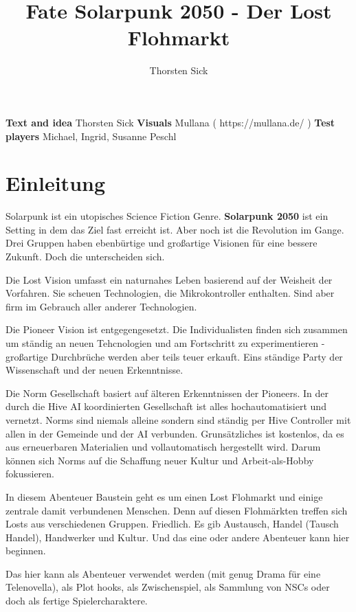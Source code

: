 \documentclass{book}
\title{Fate Solarpunk 2050 - Der Lost Flohmarkt}
\author{Thorsten Sick}
\begin{document}
%
%
\mbox{}
\thispagestyle{empty}
\BgThispage

\newpage
\begin{center}
\textbf{Text and idea}
\newline
Thorsten Sick
\newline
\textbf{Visuals}
\newline
Mullana ( https://mullana.de/ )
\newline
\textbf{Test players}
\newline
Michael, Ingrid, Susanne Peschl
\newline
\end{center}
\newpage

%

\chapter{Einleitung}

Solarpunk ist ein utopisches Science Fiction Genre. \textbf{Solarpunk 2050} ist ein Setting in dem das Ziel fast erreicht ist. Aber noch ist die Revolution im Gange. Drei Gruppen haben ebenbürtige und großartige Visionen für eine bessere Zukunft. Doch die unterscheiden sich.

Die Lost Vision umfasst ein naturnahes Leben basierend auf der Weisheit der Vorfahren. Sie scheuen Technologien, die Mikrokontroller enthalten. Sind aber firm im Gebrauch aller anderer Technologien.

Die Pioneer Vision ist entgegengesetzt. Die Individualisten finden sich zusammen um ständig an neuen Tehcnologien und am Fortschritt zu experimentieren - großartige Durchbrüche werden aber teils teuer erkauft. Eins ständige Party der Wissenschaft und der neuen Erkenntnisse.

Die Norm Gesellschaft basiert auf älteren Erkenntnissen der Pioneers. In der durch die Hive AI koordinierten Gesellschaft ist alles hochautomatisiert und vernetzt. Norms sind niemals alleine sondern sind ständig per Hive Controller mit allen in der Gemeinde und der AI verbunden. Grunsätzliches ist kostenlos, da es aus erneuerbaren Materialien und vollautomatisch hergestellt wird. Darum können sich Norms auf die Schaffung neuer Kultur und Arbeit-als-Hobby fokussieren.

In diesem Abenteuer Baustein geht es um einen Lost Flohmarkt und einige zentrale damit verbundenen Menschen. Denn auf diesen Flohmärkten treffen sich Losts aus verschiedenen Gruppen. Friedlich. Es gib Austausch, Handel (Tausch Handel), Handwerker und Kultur. Und das eine oder andere Abenteuer kann hier beginnen.

Das hier kann als Abenteuer verwendet werden (mit genug Drama für eine Telenovella), als Plot hooks, als Zwischenspiel, als Sammlung von NSCs oder doch als fertige Spielercharaktere.






\end{document}

